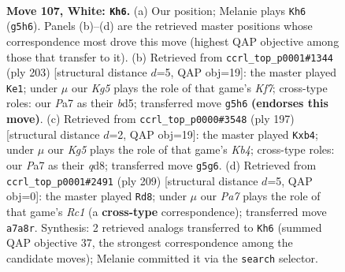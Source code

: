 \documentclass[11pt]{article}
\begin{document}
\clearpage

\begin{figure}[p]\centering
\begin{subfigure}{0.46\textwidth}\centering
\resizebox{\linewidth}{!}{%
\newchessgame
\chessboard[
  setfen={4k3/P7/6n1/6K1/8/8/8/8 w - - 4 107},
  showmover=false,
  pgfstyle=straightmove, color=movearrow, markmove={g5-h6}
]}
\caption{}
\end{subfigure}\hfill
\begin{subfigure}{0.46\textwidth}\centering
\resizebox{\linewidth}{!}{%
\newchessgame
\chessboard[
  setfen={8/8/8/3B4/8/3K4/4Nk2/8 b - - 31 102},
  showmover=false,
  pgfstyle=straightmove, color=movearrow, markmove={f2-e1}
]}
\caption{}
\end{subfigure}
\\[4pt]
\begin{subfigure}{0.46\textwidth}\centering
\resizebox{\linewidth}{!}{%
\newchessgame
\chessboard[
  setfen={3Q4/8/8/1k2K3/1N6/8/8/8 b - - 0 99},
  showmover=false,
  pgfstyle=straightmove, color=movearrow, markmove={b5-b4}
]}
\caption{}
\end{subfigure}\hfill
\begin{subfigure}{0.46\textwidth}\centering
\resizebox{\linewidth}{!}{%
\newchessgame
\chessboard[
  setfen={2r5/4k3/8/8/K7/8/3N4/8 b - - 5 105},
  showmover=false,
  pgfstyle=straightmove, color=movearrow, markmove={c8-d8}
]}
\caption{}
\end{subfigure}
\caption{\textbf{Move 107, White: \texttt{Kh6}.} (a) Our position; Melanie plays \texttt{Kh6} (\texttt{g5h6}). Panels (b)--(d) are the retrieved master positions whose correspondence most drove this move (highest QAP objective among those that transfer to it). (b) Retrieved from \texttt{ccrl\_top\_p0001\#1344} (ply 203) [structural distance $d$=5, QAP obj=19]: the master played \texttt{Ke1}; under $\mu$ our \emph{Kg5} plays the role of that game's \emph{Kf7}; cross-type roles: our \emph{P}a7 as their \emph{b}d5; transferred move \texttt{g5h6} \textbf{(endorses this move)}. (c) Retrieved from \texttt{ccrl\_top\_p0000\#3548} (ply 197) [structural distance $d$=2, QAP obj=19]: the master played \texttt{Kxb4}; under $\mu$ our \emph{Kg5} plays the role of that game's \emph{Kb4}; cross-type roles: our \emph{P}a7 as their \emph{q}d8; transferred move \texttt{g5g6}. (d) Retrieved from \texttt{ccrl\_top\_p0001\#2491} (ply 209) [structural distance $d$=5, QAP obj=0]: the master played \texttt{Rd8}; under $\mu$ our \emph{Pa7} plays the role of that game's \emph{Rc1} (a \textbf{cross-type} correspondence); transferred move \texttt{a7a8r}. Synthesis: 2 retrieved analogs transferred to \texttt{Kh6} (summed QAP objective 37, the strongest correspondence among the candidate moves); Melanie committed it via the \texttt{search} selector.}
\label{fig:thought-m212}
\end{figure}
\end{document}
